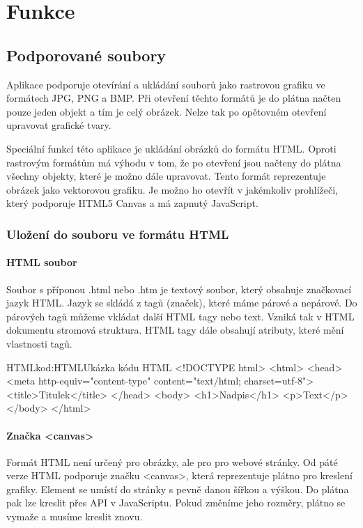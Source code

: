 \documentclass[
  field=inf,
  biblatex,
  glossaries,
  index
]{kidiplom}
\begin{document}
\section{Funkce}

\subsection{Podporované soubory}

Aplikace podporuje otevírání a ukládání souborů jako rastrovou grafiku ve formátech JPG, PNG a BMP. Při otevření těchto formátů je do plátna načten pouze jeden objekt a tím je celý obrázek. Nelze tak po opětovném otevření upravovat grafické tvary. 

Speciální funkcí této aplikace je ukládání obrázků do formátu HTML. Oproti rastrovým formátům má výhodu v tom, že po otevření jsou načteny do plátna všechny objekty, které je možno dále upravovat. Tento formát reprezentuje obrázek jako vektorovou grafiku. Je možno ho otevřít v jakémkoliv prohlížeči, který podporuje HTML5 Canvas a má zapnutý JavaScript.

\subsubsection{Uložení do souboru ve formátu HTML}

\paragraph{HTML soubor}

Soubor s příponou .html nebo .htm je textový soubor, který obsahuje značkovací jazyk HTML. Jazyk se skládá z tagů (značek), které máme párové a nepárové. Do párových tagů můžeme vkládat další HTML tagy nebo text. Vzniká tak v HTML dokumentu stromová struktura. HTML tagy dále obsahují atributy, které mění vlastnosti tagů.

\begin{kicode}{HTML}{kod:HTML}{Ukázka kódu HTML}
<!DOCTYPE html>
<html>
  <head>
  <meta http-equiv="content-type" content="text/html; charset=utf-8">
  <title>Titulek</title>
  </head>
  <body>
    <h1>Nadpis</h1>
    <p>Text</p>
  </body>
</html>
\end{kicode}

\paragraph{Značka <canvas>}

Formát HTML není určený pro obrázky, ale pro pro webové stránky. Od páté verze HTML podporuje značku <canvas>, která reprezentuje plátno pro kreslení grafiky. Element se umístí do stránky s pevně danou šířkou a výškou. Do plátna pak lze kreslit přes API v JavaScriptu. Pokud změníme jeho rozměry, plátno se vymaže a musíme kreslit znovu.
\end{document}
